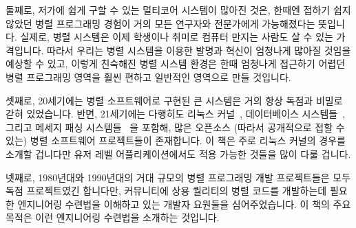 둘째로, 저가에 쉽게 구할 수 있는 멀티코어 시스템이 많아진 것은, 한때엔 접하기
쉽지 않았던 병렬 프로그래밍 경험이 거의 모든 연구자와 전문가에게 가능해졌다는
뜻입니다.  실제로, 병렬 시스템은 이제 학생이나 취미로 컴퓨터 만지는 사람도 살
수 있는 가격입니다.  따라서 우리는 병렬 시스템을 이용한 발명과 혁신이 엄청나게
많아질 것임을 예상할 수 있고, 이렇게 친숙해진 병렬 시스템 환경은 한때 엄청나게
접근하기 어렵던 병렬 프로그래밍 영역을 훨씬 편하고 일반적인 영역으로 만들
것입니다.


셋째로, 20세기에는 병렬 소프트웨어로 구현된 큰 시스템은 거의 항상 독점과 비밀로
갇혀 있었습니다.  반면, 21세기에는 다행히도 리눅스
커널~\cite{Torvalds2.6kernel}, 데이터베이스
시스템들~\cite{PostgreSQL2008,MySQL2008}, 그리고 메세지 패싱
시스템들~\cite{OpenMPI2008,BOINC2008} 을 포함해, 많은 오픈소스 (따라서
공개적으로 접할 수 있는) 병렬 소프트웨어 프로젝트들이 존재합니다.
이 책은 주로 리눅스 커널의 경우를 소개할 겁니다만 유저 레벨 어플리케이션에서도
적용 가능한 것들을 많이 다룰 겁니다.


넷째로, 1980년대와 1990년대의 거대 규모의 병렬 프로그래밍 개발 프로젝트들은
모두 독점 프로젝트였긴 합니다만, 커뮤니티에 상용 퀄리티의 병렬 코드를
개발하는데 필요한 엔지니어링 수련법을 이해하고 있는 개발자 요원들을
심어주었습니다.  이 책의 주요 목적은 이런 엔지니어링 수련법을 소개하는
것입니다.


